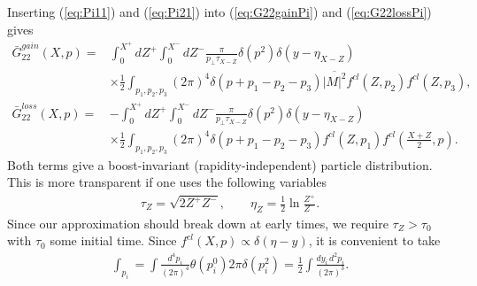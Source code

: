 \documentclass[onecolumn,showpacs,nobibnotes,nofootinbib,12pt,aps,prd,showpacs,notitlepage,nofootinbib,preprintnumbers,amsmath,amssymb]{article}
\begin{document}
Inserting (\ref{eq:Pi11}) and (\ref{eq:Pi21}) into
(\ref{eq:G22gainPi}) and (\ref{eq:G22lossPi}) gives
\begin{align}
  \bar G_{22}^{gain}(X,p)=&\int_0^{X^+} dZ^+ \int_0^{X^-} dZ^-\frac{\pi}{p_\perp \tau_{X-Z}}\delta(p^2)\delta(y-\eta_{X-Z})\nonumber\\
  &\times\frac{1}{2}\int_{p_1,p_2,p_3} (2\pi)^4\delta(p+p_1-p_2-p_3)\overline{|M|^2} f^{cl}(Z,p_2)f^{cl}(Z,p_3),  \label{gain_init} \\
  \bar G_{22}^{loss}(X,p)=&-\int_0^{X^+} dZ^+ \int_0^{X^-} dZ^-\frac{\pi}{p_\perp \tau_{X-Z}}\delta(p^2)\delta(y-\eta_{X-Z})\nonumber\\
  &\times\frac{1}{2}\int_{p_1,p_2,p_3} (2\pi)^4\delta(p+p_1-p_2-p_3)
  f^{cl}(Z,p_1)f^{cl}\left( \frac{X+Z}{2} ,p \right). \label{loss_init} 
\end{align}
Both terms give a boost-invariant (rapidity-independent) particle
distribution. This is more transparent if one uses the following
variables
\begin{align}
  \tau_Z=\sqrt{2 Z^+ Z^-}, \qquad
  \eta_Z=\frac{1}{2}\ln\frac{Z^+}{Z^-}.
\end{align}
Since our approximation should break down at early times, we require
$\tau_Z>\tau_0$ with $\tau_0$ some initial time.  Since
$f^{cl}(X,p)\propto \delta(\eta-y)$, it is convenient to take
\begin{align}
  \int_{p_i}=\int\frac{d^4p_i}{(2\pi)^4}\theta(p_i^0)2\pi
  \delta(p_i^2)=\frac{1}{2}\int\frac{d y_i \, d^2 p_i}{(2\pi)^3}.
\end{align}
\end{document}
